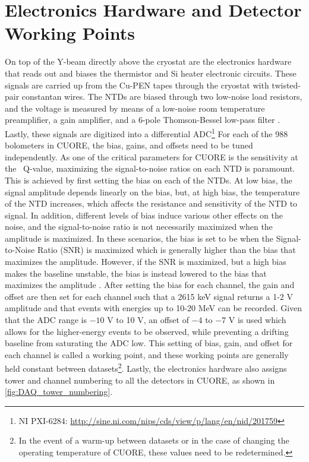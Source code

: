 \section{Electronics Hardware and Detector Working Points}
\label{sec:Electronics Hardware}
On top of the Y-beam directly above the cryostat are the electronics hardware that reads out and biases the thermistor and Si heater electronic circuits.
These signals are carried up from the Cu-PEN tapes through the cryostat with twisted-pair constantan wires.
The NTDs are biased through two low-noise load resistors, and the voltage is measured by means of a low-noise room temperature preamplifier, a gain amplifier, and a 6-pole Thomson-Bessel low-pass filter \cite{doi:10.1063/1.4936269, PESSINA2000132, ARNABOLDI2010327}.
Lastly, these signals are digitized into a differential ADC\footnote{\RaggedRight NI PXI-6284: \url{http://sine.ni.com/nips/cds/view/p/lang/en/nid/201759}}
For each of the 988 bolometers in CUORE, the bias, gains, and offsets need to be tuned independently.
As one of the critical parameters for CUORE is the sensitivity at the \zeronubb~Q-value, maximizing the signal-to-noise ratios on each NTD is paramount.
This is achieved by first setting the bias on each of the NTDs.
At low bias, the signal amplitude depends linearly on the bias, but, at high bias, the temperature of the NTD increases, which affects the resistance and sensitivity of the NTD to signal.
In addition, different levels of bias induce various other effects on the noise, and the signal-to-noise ratio is not necessarily maximized when the amplitude is maximized.
In these scenarios, the bias is set to be when the Signal-to-Noise Ratio (SNR) is maximized which is generally higher than the bias that maximizes the amplitude.
However, if the SNR is maximized, but a high bias makes the baseline unstable, the bias is instead lowered to the bias that maximizes the amplitude \cite{Lucia:LoadCurvesDoc}.
After setting the bias for each channel, the gain and offset are then set for each channel such that a 2615 keV signal returns a 1-2 V amplitude and that events with energies up to 10-20 MeV can be recorded.
Given that the ADC range is $-10$ V to 10 V, an offset of $-4$ to $-7$ V is used which allows for the higher-energy events to be observed, while preventing a drifting baseline from saturating the ADC low.
This setting of bias, gain, and offset for each channel is called a working point, and these working points are generally held constant between datasets\footnote{In the event of a warm-up between datasets or in the case of changing the operating temperature of CUORE, these values need to be redetermined.}.
Lastly, the electronics hardware also assigns tower and channel numbering to all the detectors in CUORE, as shown in \autoref{fig:DAQ_tower_numbering}.

